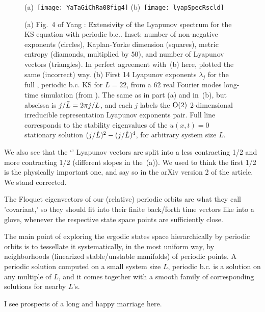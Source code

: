 \begin{description}
  \begin{figure}
    (a)~\texttt{[image: YaTaGiChRa08fig4]}
    (b)~\texttt{[image: lyapSpecRscld]}
    \caption{
      (a)
      Fig.~4 of
      Yang \etal{}:
      Extensivity of the Lyapunov spectrum for the KS equation with
      periodic b.c.. Inset: number of non-negative exponents (circles),
      Kaplan-Yorke dimension (squares), metric entropy (diamonds,
      multiplied by $50$), and number of {\entangled} Lyapunov vectors (triangles).
      In perfect agreement with
      \,(b) here, plotted the same
      (incorrect) way.
      (b)
      First 14 Lyapunov exponents $\lambda_j$ for the full
      \statesp, periodic b.c. KS for $L=22$, from a 62 real Fourier
      modes long-time simulation (from ).
      The same as in part (a) and in \,(b), but
      abscissa is $j/\tilde{L} = 2 \pi j/L$, and each $j$ labels
      the $\textrm{O}(2)$ 2-dimensional irreducible representation
      Lyapunov exponents pair.  Full line corresponds to
      the stability eigenvalues
      of the $u(x,t)=0$ stationary solution
      $(j/\tilde{L})^2- (j/\tilde{L})^4$, for arbitrary system size $L$.
    }
    \label{fig:lyapSpecRscld}
  \end{figure}


  We also see
  that the `{\entangled}' Lyapunov vectors are split into a less contracting 1/2
  and more contracting 1/2 (different slopes in the
  \,(a)). We
  used to think the first 1/2 is the physically important one,
  and say so in the arXiv version 2 of the article.
  We stand corrected.

  The Floquet eigenvectors of our (relative) periodic orbits are
  what they call 'covariant,' so they should fit into their finite back/forth
  time vectors like into a glove, whenever the respective state space
  points are sufficiently close.

  The main point of exploring the ergodic states space hierarchically
  by periodic orbits is to tessellate it systematically, in the most
  uniform way, by neighborhoods (linearized stable/unstable manifolds)
  of periodic points. A periodic solution computed on a small system
  size $L$, periodic b.c. is a solution on any multiple of $L$, and it comes
  together with a smooth family of corresponding solutions for nearby
  $L$'s.

  I see prospects of a long and happy marriage here.


\end{description}
